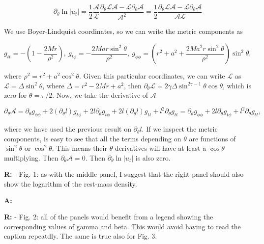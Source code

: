 \documentclass{article}
\begin{document}
{\begin{equation}
\partial_{\theta} \ln|u_t| = \frac{1}{2} \frac{\mathcal{A}}{\mathcal{L}}\frac{\partial_{\theta}{\mathcal{L}}\mathcal{A} - \mathcal{L}\partial_{\theta}\mathcal{A}}{\mathcal{A}^2} = \frac{1}{2} \frac{\partial_{\theta}{\mathcal{L}}\mathcal{A} - \mathcal{L}\partial_{\theta}\mathcal{A}}{\mathcal{A} \mathcal{L}}
\end{equation}

We use Boyer-Lindquist coordinates, so we can write the metric components as

\begin{equation}
g_{tt} = - \left(1 - \frac{2Mr}{\rho^2}\right), \ g_{t\phi} = -\frac{2Mar\sin^2\theta}{\rho^2}, \ g_{\phi\phi} = \left(r^2 + a^2 + \frac{2Ma^2r\sin^2\theta}{\rho^2}\right) \sin^2 \theta,
\end{equation}

where $\rho^2 = r^2 + a^2\cos^2 \theta$. Given this particular coordinates, we can write $\mathcal{L}$ as $\mathcal{L} = \Delta \sin^2 \theta$, where $\Delta = r^2 - 2Mr + a^2$, then $\partial_{\theta}\mathcal{L} = 2\gamma \Delta \sin^{2\gamma - 1} \theta \cos \theta$, which is zero for $\theta = \pi/2$. Now, we take the derivative of $\mathcal{A}$

\begin{equation}
\partial_{\theta} \mathcal{A} = \partial_{\theta} g_{\phi\phi} + 2 (\partial_{\theta} l) g_{t\phi} + 2l\partial_{\theta} g_{t\phi} + 2l(\partial_{\theta} l) g_{tt} + l^2 \partial_{\theta} g_{tt} = \partial_{\theta} g_{\phi\phi} + 2l\partial_{\theta} g_{t\phi} + l^2 \partial_{\theta} g_{tt},
\end{equation}

where we have used the previous result on $\partial_{\theta} l$. If we inspect the metric components, is easy to see that all the terms depending on $\theta$ are functions of $\sin^2 \theta$ or $\cos^2 \theta$. This means their $\theta$ derivatives will have at least a $\cos \theta$ multiplying. Then $\partial_{\theta} \mathcal{A} = 0$. Then $\partial_{\theta} \ln|u_t|$ is also zero.

\bigskip

{\bf R:} - Fig. 1: as with the middle panel, I suggest that the right
panel should also show the logarithm of the rest-mass density.

\bigskip

{\bf A:} 

\bigskip

{\bf R:} - Fig. 2: all of the panels would benefit from a legend showing the
corresponding values of gamma and beta. This would avoid having to read the caption repeatdly. The same is true also for Fig. 3.

}
\end{document}
